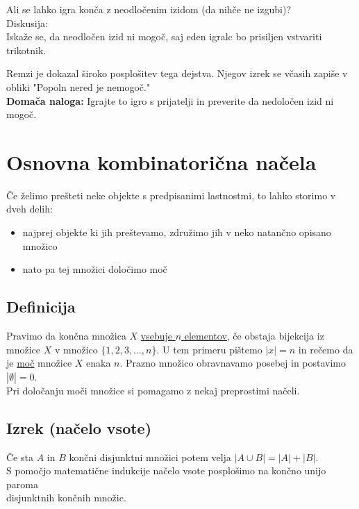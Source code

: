 \documentclass[12pt]{article}
\begin{document}
\noindent
Ali se lahko igra konča z neodločenim izidom (da nihče ne izgubi)? \\

\noindent
Diskusija: \\
Iskaže se, da neodločen izid ni mogoč, saj eden igralc bo prisiljen vstvariti trikotnik.
\begin{center}
\end{center}
Remzi je dokazal široko posplošitev tega dejstva. Njegov izrek se včasih zapiše v obliki "Popoln nered je nemogoč." \\

\noindent
\textbf{Domača naloga:} Igrajte to igro s prijatelji in preverite da nedoločen izid ni mogoč.



\section{Osnovna kombinatorična načela}
Če želimo prešteti neke objekte s predpisanimi lastnostmi, to lahko storimo v dveh delih:
\begin{itemize}
    \item najprej objekte ki jih preštevamo, združimo jih v neko natančno opisano množico
    \item nato pa tej množici določimo moč
\end{itemize}

\subsection{Definicija}
Pravimo da končna množica $X$ \underline{vsebuje $n$ elementov}, če obstaja bijekcija iz množice $X$ v množico $\{1, 2, 3, \dots, n\}$. U tem primeru pištemo $|x|=n$ in rečemo da je \underline{moč} množice $X$ enaka $n$. Prazno množico obravnavamo posebej in postavimo $|\emptyset|= 0$. \\[1em]

\noindent
Pri določanju moči množice si pomagamo z nekaj preprostimi načeli.

\subsection{Izrek (načelo vsote)}
Če sta $A$ in $B$ končni disjunktni množici potem velja $|A \cup B| = |A| + |B|$. \\

\noindent
S pomočjo matematične indukcije načelo vsote posplošimo na končno unijo paroma \\ 
disjunktnih končnih množic. \\
\end{document}
